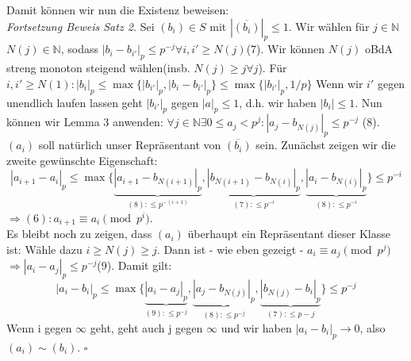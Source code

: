 \documentclass[12pt,ngerman]{scrartcl}
\begin{document}
Damit können wir nun die Existenz beweisen:\\
\textit{Fortsetzung Beweis Satz 2.} Sei $(b_i) \in S$ mit $|\overline{(b_i)}|_p\le 1$. Wir wählen für $j \in \mathbb{N}$ $N(j) \in \mathbb{N}$, sodass $|b_i-b_{i'}|_p\le p^{-j} \forall i,i'\ge N(j)$(7). Wir können $N(j)$ oBdA streng monoton steigend wählen(insb. $N(j)\ge j \forall j$). Für $i,i' \ge N(1): |b_i|_p \le \max\{|b_{i'}|_p,|b_i-b_{i'}|_p\} \le \max\{|b_{i'}|_p,1/p\}$ Wenn wir $i'$ gegen unendlich laufen lassen geht $|b_{i'}|_p$ gegen $|a|_p\le 1$, d.h. wir haben $|b_i|\le 1$. Nun können wir Lemma 3 anwenden: $\forall j \in \mathbb{N} \exists 0 \le a_j < p^{j}: |a_j-b_{N(j)}|_p\le p^{-j}$ (8).\\
$(a_i)$ soll natürlich unser Repräsentant von $\overline{(b_i)}$ sein. Zunächst zeigen wir die zweite gewünschte Eigenschaft: \[|a_{i+1}-a_i|_p\le \max\{\underbrace{|a_{i+1}-b_{N(i+1)}|_p}_{(8): \le p^{-(i+1)}},\underbrace{|b_{N(i+1)}-b_{N(i)}|_p}_{(7): \le p^{-i}},\underbrace{|a_i-b_{N(i)}|_p}_{(8): \le p^{-i}}\}\le p^{-i}\] $\Rightarrow (6): a_{i+1} \equiv a_i \pmod {p^i}$.\\
Es bleibt noch zu zeigen, dass $(a_i)$ überhaupt ein Repräsentant dieser Klasse ist: Wähle dazu $i\ge N(j)\ge j$. Dann ist - wie eben gezeigt - $a_i \equiv a_j \pmod p^j$ $\Rightarrow |a_i-a_j|_p \le p^{-j}$(9). Damit gilt: \[|a_i-b_i|_p\le\max\{\underbrace{|a_i-a_j|_p}_{(9): \le p^{-j}},\underbrace{|a_j-b_{N(j)}|_p}_{(8): \le p^{-j}},\underbrace{|b_{N(j)}-b_i|_p}_{(7): \le p-j}\} \le p^{-j}\]
Wenn i gegen $\infty$ geht, geht auch j gegen $\infty$ und wir haben $|a_i-b_i|_p \rightarrow 0$, also $(a_i) \sim (b_i)$. \hfill $\square$
\end{document}
